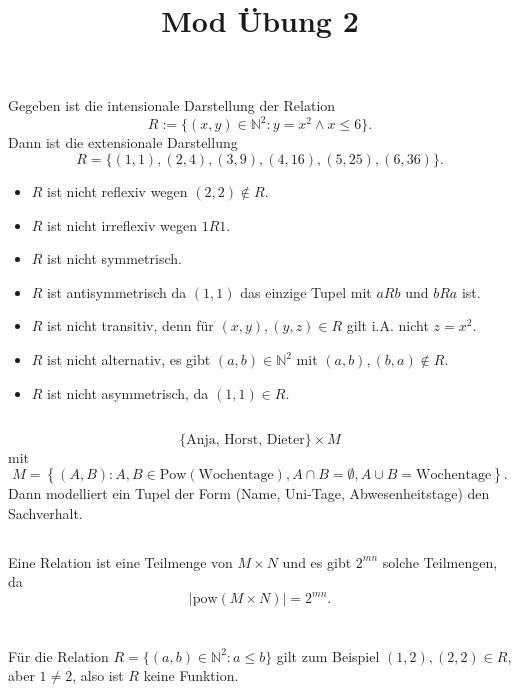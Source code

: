 \documentclass{article}
\title{Mod Übung 2}
\begin{document}
\setcounter{section}{1}
\section{}
\subsection{}
Gegeben ist die intensionale Darstellung der Relation
$$R := \{ (x,y) \in ℕ^2: y=x^2 \wedge x \le 6 \}.$$
Dann ist die extensionale Darstellung
$$R = \{(1, 1), (2,4), (3,9), (4, 16), (5,25), (6,36) \}.$$

\begin{itemize}
\item $R$ ist nicht reflexiv wegen $(2,2)\notin R$.
\item $R$ ist nicht irreflexiv wegen $1R1$.
\item $R$ ist nicht symmetrisch.
\item $R$ ist antisymmetrisch da $(1,1)$ das einzige Tupel mit $aRb$ und $bRa$ ist.
\item $R$ ist nicht transitiv, denn für $(x,y),(y,z)\in R$ gilt i.A. nicht
$z = x^2.$
\item $R$ ist nicht alternativ, es gibt $(a,b)\in ℕ^2$ mit $(a,b),(b,a)\notin R$.
\item $R$ ist nicht asymmetrisch, da $(1,1)\in R$.
\end{itemize}

\subsection{}
$$\{\text{Anja, Horst, Dieter} \} \times M$$
mit 
$$M = \left \{ (A,B):A, B \in \mathrm{Pow}(\text{Wochentage}), A\cap B = ∅, A\cup B=\text{Wochentage} \right\}.$$
Dann modelliert ein Tupel der Form (Name, Uni-Tage, Abwesenheitstage) den Sachverhalt. 
\subsection{}
Eine Relation ist eine Teilmenge von $M\times N$ und es gibt $2^{mn}$ solche Teilmengen, da
$$| \mathrm{pow}(M\times N)| = 2^{mn}.$$

\section{}
\subsection{} Für die Relation $R = \{ (a,b) \in ℕ^2 : a\le b\}$ gilt zum Beispiel
$(1,2),(2,2)\in R$, aber $1\ne 2$, also ist $R$ keine Funktion.
\end{document}
